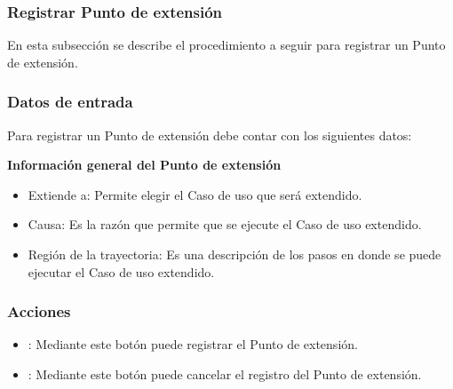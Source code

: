 \subsubsection{Registrar Punto de extensión}
En esta subsección se describe el procedimiento a seguir para registrar un Punto de extensión.

\subsubsection*{Datos de entrada}
\begin{description}
	\item Para registrar un Punto de extensión debe contar con los siguientes datos: \hspace{10pt}
	
	\begin{description}
	    \item \textbf{Información general del Punto de extensión}
	    \begin{itemize}
		  \item Extiende a: Permite elegir el Caso de uso que será extendido.
		  \item Causa: Es la razón que permite que se ejecute el Caso de uso extendido.
		  \item Región de la trayectoria: Es una descripción de los pasos en donde se puede ejecutar el Caso de uso extendido.
	    \end{itemize}
	 \end{description}
\end{description}

\subsubsection*{Acciones}
\begin{itemize}
  \item {}: Mediante este botón puede registrar el Punto de extensión.
  \item {}: Mediante este botón puede cancelar el registro del Punto de extensión.
\end{itemize}
	
	
